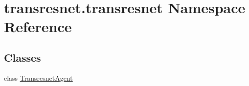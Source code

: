 \hypertarget{namespacetransresnet_1_1transresnet}{}\section{transresnet.\+transresnet Namespace Reference}
\label{namespacetransresnet_1_1transresnet}
\subsection*{Classes}
\begin{DoxyCompactItemize}
\item 
class \hyperlink{classtransresnet_1_1transresnet_1_1TransresnetAgent}{Transresnet\+Agent}
\end{DoxyCompactItemize}
